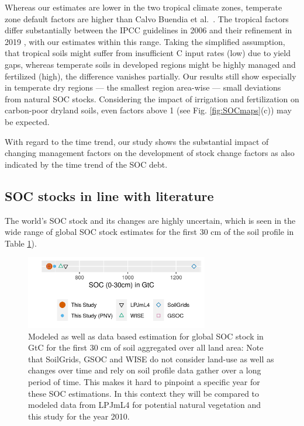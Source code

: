 \documentclass[gc, manuscript]{copernicus}
\begin{document}
Whereas our estimates are lower in the two tropical climate zones, temperate zone default factors are higher than Calvo Buendia et al.~\citeyearpar{calvo_buendia_ipcc_2019}. The tropical factors differ substantially between the IPCC guidelines in 2006 \citep{eggleston_ipcc_2006} and their refinement in 2019 \citep{calvo_buendia_ipcc_2019}, with our estimates within this range.
Taking the simplified assumption, that tropical soils might suffer from insufficient C input rates (low) due to yield gaps, whereas temperate soils in developed regions might be highly managed and fertilized (high), the difference vanishes partially. Our results still show especially in temperate dry regions --- the smallest region area-wise --- small deviations from natural SOC stocks. Considering the impact of irrigation and fertilization on carbon-poor dryland soils, even factors above 1 (see Fig. \ref{fig:SOCmaps}(c)) may be expected.

With regard to the time trend, our study shows the substantial impact of changing management factors on the development of stock change factors as also indicated by the time trend of the SOC debt.

\hypertarget{soc-stocks-in-line-with-literature}{%
\subsection{SOC stocks in line with literature}\label{soc-stocks-in-line-with-literature}}

The world's SOC stock and its changes are highly uncertain, which is seen in the wide range of global SOC stock estimates for the first 30 cm of the soil profile \citep{batjes_harmonized_2016, hengl_soilgrids250m_2017, fao_global_2018, schaphoff_lpjml4_2018-1} in Table \ref{fig:SOCglo}).

\begin{figure}[h]
\includegraphics[width=8cm]{../ResultNotebooks/Output/Images/glo_comparisonfigure} \caption{Modeled as well as data based estimation for global SOC stock in GtC for the first 30 cm of soil aggregated over all land area: Note that SoilGrids, GSOC and WISE do not consider land-use as well as changes over time and rely on soil profile data gather over a long period of time. This makes it hard to pinpoint a specific year for these SOC estimations. In this context they will be compared to modeled data from LPJmL4 for potential natural vegetation and this study for the year 2010.}\label{fig:SOCglo}
\end{figure}
\end{document}
